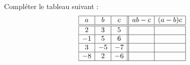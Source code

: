 
\begin{exercice}\label{exosmath-0755}

Compléter le tableau suivant :
\begin{equation*}
    \begin{array}[]{|c|c|c||c|c|}
        \hline
        a&b&c&ab-c&(a-b)c\\
        \hline\hline
        2&3&5&&\\
        \hline
        -1&5&6&&\\
        \hline
        3&-5&-7&&\\
        \hline
        -8&2&-6&&\\
        \hline
    \end{array}
\end{equation*}

\end{exercice}
